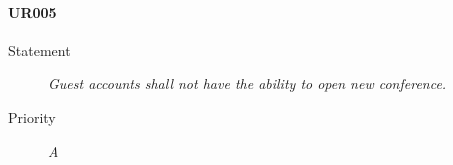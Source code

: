 \paragraph{UR005}
  \begin{description}
  \item [Statement] 
    \textit{ Guest accounts shall not have the ability to open new conference.}
  \item [Priority] \textit{A}
\end{description}
